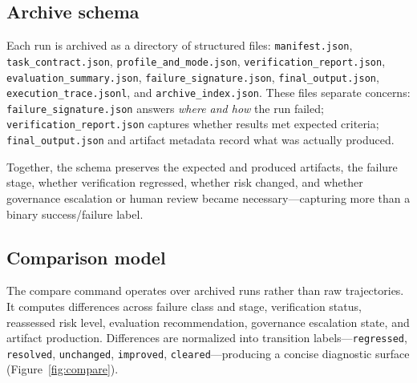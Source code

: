 \documentclass[11pt]{article}
\begin{document}
\subsection{Archive schema}

Each run is archived as a directory of structured files: \texttt{manifest.json}, \texttt{task\_contract.json}, \texttt{profile\_and\_mode.json}, \texttt{verification\_report.json}, \texttt{evaluation\_summary.json}, \texttt{failure\_signature.json}, \texttt{final\_output.json}, \texttt{execution\_trace.jsonl}, and \texttt{archive\_index.json}. These files separate concerns: \texttt{failure\_signature.json} answers \emph{where and how} the run failed; \texttt{verification\_report.json} captures whether results met expected criteria; \texttt{final\_output.json} and artifact metadata record what was actually produced.

Together, the schema preserves the expected and produced artifacts, the failure stage, whether verification regressed, whether risk changed, and whether governance escalation or human review became necessary---capturing more than a binary success/failure label.

\subsection{Comparison model}

The compare command operates over archived runs rather than raw trajectories. It computes differences across failure class and stage, verification status, reassessed risk level, evaluation recommendation, governance escalation state, and artifact production. Differences are normalized into transition labels---\texttt{regressed}, \texttt{resolved}, \texttt{unchanged}, \texttt{improved}, \texttt{cleared}---producing a concise diagnostic surface (Figure~\ref{fig:compare}).
\end{document}
